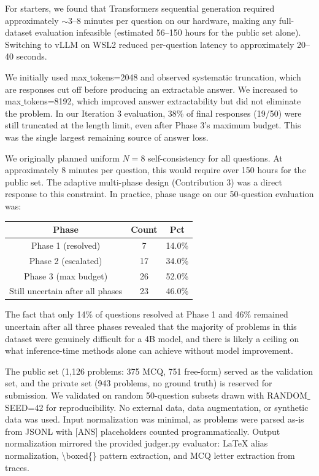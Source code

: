 \documentclass{article}
\begin{document}
For starters, we found that Transformers sequential generation required approximately $\sim$3–8 minutes per question on our hardware, making any full-dataset evaluation infeasible (estimated 56–150 hours for the public set alone). Switching to vLLM on WSL2 reduced per-question latency to approximately 20–40 seconds. 

We initially used max$\_$tokens=2048 and observed systematic truncation, which are responses cut off before producing an extractable answer. We increased to max$\_$tokens=8192, which improved answer extractability but did not eliminate the problem. In our Iteration 3 evaluation, 38\% of final responses (19/50) were still truncated at the length limit, even after Phase 3's maximum budget. This was the single largest remaining source of answer loss.

We originally planned uniform $N=8$ self-consistency for all questions. At approximately 8 minutes per question, this would require over 150 hours for the public set. The adaptive multi-phase design (Contribution 3) was a direct response to this constraint. In practice, phase usage on our 50-question evaluation was:
\begin{center}
    \def\arraystretch{2.0}
    \begin{tabular}{||c | c c||}
        \hline
        \textbf{Phase} & \textbf{Count} & \textbf{Pct}\\
        \hline
        Phase 1 (resolved) & 7 & 14.0\% \\
        \hline
        Phase 2 (escalated) & 17 & 34.0\% \\
        \hline
        Phase 3 (max budget) & 26 & 52.0\% \\
        \hline
        Still uncertain after all phases & 23 & 46.0\% \\
        \hline
    \end{tabular}
\end{center}
The fact that only 14\% of questions resolved at Phase 1 and 46\% remained uncertain after all three phases revealed that the majority of problems in this dataset were genuinely difficult for a 4B model, and there is likely a ceiling on what inference-time methods alone can achieve without model improvement.

The public set (1,126 problems: 375 MCQ, 751 free-form) served as the validation set, and the private set (943 problems, no ground truth) is reserved for submission. We validated on random 50-question subsets drawn with RANDOM$\_$SEED=42 for reproducibility. No external data, data augmentation, or synthetic data was used. Input normalization was minimal, as problems were parsed as-is from JSONL with [ANS] placeholders counted programmatically. Output normalization mirrored the provided judger.py evaluator: LaTeX alias normalization, \textbackslash boxed\{\} pattern extraction, and MCQ letter extraction from traces.
\end{document}
